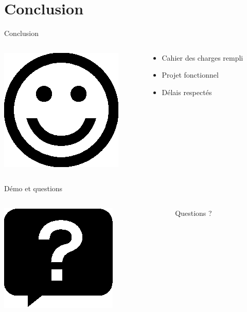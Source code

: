 \documentclass[xcolor=x11names,12pt,compress]{beamer}
\begin{document}
\section*{Conclusion}
\begin{frame}{Conclusion}
    \begin{columns}
        \begin{column}{0.2\textwidth}
        \includegraphics{happy.eps}
    \end{column}
    \begin{column}{0.5\textwidth}
        \begin{itemize}
	    \item Cahier des charges rempli
	    \item Projet fonctionnel
	    \item Délais respectés
    \end{itemize}
    \end{column}
\end{columns}
\end{frame}

\begin{frame}{Démo et questions}
    \begin{columns}
        \begin{column}{0.2\textwidth}
        \includegraphics{questions.eps}
    \end{column}
    \begin{column}{0.5\textwidth}
        \Huge Questions ?
    \end{column}
\end{columns}
\end{frame}


\end{document}
